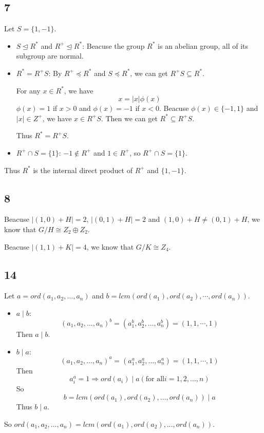 \documentclass[draft]{article}
\begin{document}
		\subsection*{7}
			Let $S = \{ 1, -1 \}$.
			\begin{itemize}
				\item $S \unlhd R^*$ and $R^+ \unlhd R^*$:
					Beacuse the group $R^*$ is an abelian group, all of its subgroup are
					normal.
				\item $R^* = R^+S$:
					By $R^+ \preceq R^*$ and $S \preceq R^*$, we can get $R^+S \subseteq
					R^*$.

					For any $x \in R^*$, we have 
					$$
						x = \vert x \vert\phi(x) 
					$$
					$\phi(x) = 1$ if $x > 0$ and $\phi(x) = -1$ if $x < 0$.
					Beacuse $\phi(x) \in \{ -1, 1\}$ and $\vert x \vert \in Z^+$, we have $x \in
					R^+S$. Then we can get $R^* \subseteq R^+S$.

					Thus $R^* = R^+S$.


				\item $R^+ \cap S = \{1\}$: $-1 \not\in R^+$ and $1 \in R^+$, so $R^+
					\cap S = \{1\}$.
			\end{itemize}
			Thus $R^*$ is the internal direct product of $R^+$ and $\{1,-1\}$.
		\subsection*{8}

		Beacuse $\vert (1,0) + H \vert = 2$,  $\vert (0,1) + H \vert = 2$ and 
		$(1,0) + H \neq (0,1) + H$, we know that $G/H \cong Z_2 \oplus Z_2$.
		
		Beacuse $\vert (1,1) + K \vert = 4$, we know that $G/K \cong Z_4$.

		\subsection*{14}
			Let $a = ord(a_1,a_2,\dots,a_n)$ and $b =
			lcm(ord(a_1),ord(a_2),\cdots,ord(a_n))$.
			\begin{itemize}
				\item $a \mid b$:
					$$(a_1,a_2,\dots,a_n)^b = (a_{1}^b,a_{2}^b,\dots,a_n^b) = (1,1,\cdots,1)$$
					Then $a \mid b$.
				\item $b \mid a$:
					$$
						(a_1,a_2,\dots,a_n)^a = (a_1^a,a_2^a,\dots,a_n^a) = (1,1,\cdots,1)
					$$
					Then
					$$
						a_i^a = 1 \Rightarrow ord(a_i) \mid a (\text{for all} i = 1, 2,
						\dots, n)
					$$
					So
					$$
						b = lcm(ord(a_1),ord(a_2),\dots,ord(a_n)) \mid a
					$$
					Thus $b \mid a$.
			\end{itemize}
			So $ord(a_1,a_2,\dots,a_n) = lcm(ord(a_1),ord(a_2),\dots,ord(a_n))$.
\end{document}
